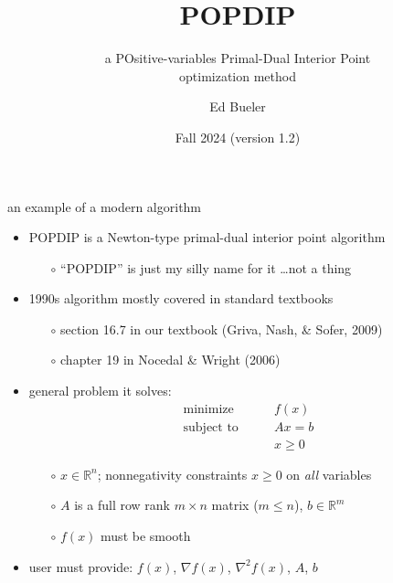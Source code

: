 \documentclass[10pt,hyperref,dvipsnames]{beamer}
\title{POPDIP}
\subtitle{a POsitive-variables Primal-Dual Interior Point \\ optimization method}
\author{Ed Bueler}
\institute[MATH 661]{MATH 661 Optimization}
\date{Fall 2024 (version 1.2)}
\newcommand{\grad}{\nabla}
\newcommand{\RR}{\mathbb{R}}
\begin{document}
\beamertemplatenavigationsymbolsempty

\begin{frame}
  \maketitle
\end{frame}


\begin{frame}{an example of a modern algorithm}

\begin{itemize}
\item POPDIP is a Newton-type primal-dual interior point algorithm
    \begin{itemize}
    \item[$\circ$] ``POPDIP'' is just my silly name for it \dots not a thing
    \end{itemize}
\item 1990s algorithm mostly covered in standard textbooks
    \begin{itemize}
    \item[$\circ$] section 16.7 in our textbook (Griva, Nash, \& Sofer, 2009)
    \item[$\circ$] chapter 19 in Nocedal \& Wright (2006)
    \end{itemize}

\bigskip
\item general problem it solves:
\begin{equation*}
\begin{matrix}
\text{minimize} \qquad   & f(x) \\
\text{subject to} \qquad & A x = b \\
                         & x \ge 0
\end{matrix}
\end{equation*}

    \begin{itemize}
    \item[$\circ$] $x\in \RR^n$; nonnegativity constraints $x\ge 0$ on \emph{all} variables
    \item[$\circ$] $A$ is a full row rank $m\times n$ matrix ($m\le n$), $b\in\RR^m$
    \item[$\circ$] $f(x)$ must be smooth
    \end{itemize}
\item user must provide: $f(x)$, $\grad f(x)$, $\grad^2 f(x)$, $A$, $b$
\end{itemize}
\end{frame}
\end{document}
